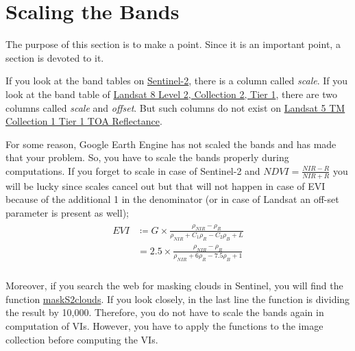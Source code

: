 \documentclass{article}
\def\func#1{{\color{Purple}{\textbf{\texttt{#1}}}}}
\newcommand{\EVI}{E\!V\!I}
\newcommand{\NDVI}{N\!D\!V\!I}
\newcommand{\NIR}{N\!I\!R}
\begin{document}
\section{Scaling the Bands}
\label{sec:Scaling-the-Bands}
The purpose of this section is to make a point.
Since it is an important point, a section is devoted to it.

If you look at the band tables on \href{https://developers.google.com/earth-engine/datasets/catalog/COPERNICUS_S2#bands}{Sentinel-2},
there is a column called \emph{scale}. If you look at the band
table of \href{https://developers.google.com/earth-engine/datasets/catalog/LANDSAT_LC08_C02_T1_L2#bands}{Landsat 8 Level 2, Collection 2, Tier 1}, there are two columns called \emph{scale} and \emph{offset}. But such columns do not exist on 
\href{https://developers.google.com/earth-engine/datasets/catalog/LANDSAT_LT05_C01_T1_TOA#bands}{Landsat 5 TM Collection 1 Tier 1 TOA Reflectance}.

For some reason, Google Earth Engine has not scaled the bands
and has made that your problem. So, you have to scale the bands
properly during computations. If you forget to scale in case of Sentinel-2 and 
$\NDVI = \frac{\NIR - R}{\NIR + R}$ you will be lucky since scales
cancel out but that will not happen in case of EVI because 
of the additional 1 in the denominator 
(or in case of Landsat an off-set parameter is present as well);
\begin{gather}\label{eq:EVIeq} %
\begin{aligned}
\EVI &\coloneqq  G \times \frac{\rho_{NIR} - \rho_R}{\rho_{NIR} + C_1 \rho_R - C_2 \rho_B + L} \\ 
   &= 2.5 \times \frac{\rho_{NIR} - \rho_R}{\rho_{NIR} + 6 \rho_R - 7.5 \rho_B + 1} \\ 
\end{aligned}
\end{gather} 

Moreover, if you search the web for masking clouds in Sentinel,
you will find the function \href{https://developers.google.com/earth-engine/datasets/catalog/COPERNICUS_S2}{maskS2clouds}. 
If you look closely, in the last line the function is dividing 
the result by 10,000. Therefore, you do not have to scale
the bands again in computation of VIs. However,
you have to apply the \func{maskS2clouds} functions
to the image collection before computing the VIs.

\end{document}

